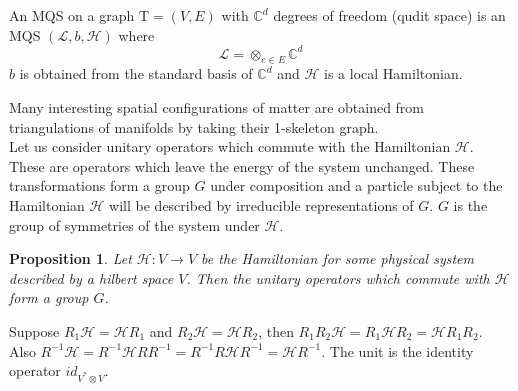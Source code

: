 \documentclass{article}
\newtheorem{proposition}[theorem]{Proposition}
\newenvironment{proof}[1][Proof]{\begin{trivlist}
\item[\hskip \labelsep {\bfseries #1}]}{\end{trivlist}}
\newenvironment{definition}[1][Definition]{\begin{trivlist}
\item[\hskip \labelsep {\bfseries #1}]}{\end{trivlist}}
\newcommand{\Tau}{\mathrm{T}}
\newcommand{\ham}{\mathcal{H}}
\begin{document}
\begin{definition}
An MQS on a graph $\Tau = (V,E)$ with $\mathbb{C}^d$ degrees of freedom (qudit space) is an MQS $(\mathcal{L},b, \mathcal{H})$ where
$$ \mathcal{L} = \otimes_{e\in E} \mathbb{C}^d$$
$b$ is obtained from the standard basis of $\mathbb{C}^d$ and $\mathcal{H}$ is a local Hamiltonian.
\end{definition}
Many interesting spatial configurations of matter are obtained from triangulations of manifolds by taking their 1-skeleton graph.\\
Let us consider unitary operators which commute with the Hamiltonian $\mathcal{H}$. These are operators which leave the energy of the system unchanged. These transformations form a group $G$ under composition and a particle subject to the Hamiltonian $\mathcal{H}$ will be described by irreducible representations of $G$. $G$ is the group of symmetries of the system under $\mathcal{H}$.

\begin{proposition}
Let $\mathcal{H}:V\rightarrow V$ be the Hamiltonian for some physical system described by a hilbert space $V$. Then the unitary operators which commute with $\mathcal{H}$ form a group $G$.
\end{proposition}
\begin{proof}
Suppose $R_1\ham=\ham R_1$ and $R_2\ham=\ham R_2$, then $R_1R_2\ham=R_1\ham R_2 = \ham R_1R_2$. Also $R^{-1}\ham = R^{-1}\ham RR^{-1} = R^{-1}R\ham R^{-1} =\ham R^{-1}$. The unit is the identity operator $id_{V^*\otimes V}$.
\end{proof}
\end{document}
